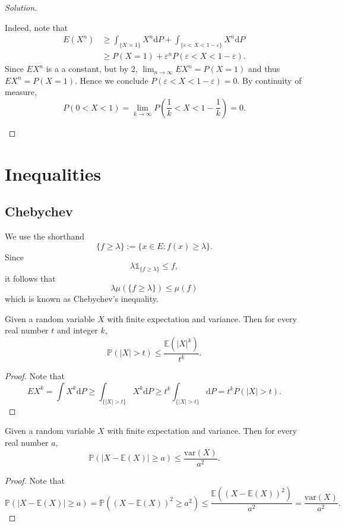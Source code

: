 \documentclass[11pt,singlecolumn, openany, citestyle=authoryear]{elegantbook}
\begin{document}
\begin{CJK}{UTF8}{gbsn}
\begin{proof}[Solution]
\begin{enumerate}
        Indeed, note that 
        \begin{align*}
            E(X^n)&\geqslant \int_{\{X=1\}}X^n \mathrm{d}P+\int_{\{\varepsilon<X<1-\varepsilon\}}
            X^n \mathrm{d}P \\
            &\geqslant P(X=1)+\varepsilon^nP(\varepsilon<X<1-\varepsilon). 
        \end{align*}
        Since $EX^n$ is a a constant, but by 2, $\lim_{n\to\infty} EX^n=P(X=1)$ and thus 
        $EX^n=P(X=1)$. Hence we conclude $P(\varepsilon < X < 1-\varepsilon)=0$.
        By continuity of measure, 
        $$
        P(0<X<1)=\lim_{k\to\infty}P(\frac{1}{k}<X<1-\frac{1}{k})=0.
        $$
    \end{enumerate}
\end{proof}

\section{Inequalities}
\subsection{Chebychev}
We use the shorthand
$$
\{f \geq \lambda\} := \{x \in E : f(x) \geq \lambda\}.
$$
Since 
$$
\lambda \mathds{1}_{\{f \geq \lambda\}} \leq f,
$$
it follows that 
$$
\lambda \mu(\{f \geq \lambda\})\leq \mu(f)
$$
which is known as Chebychev's inequality. 
\begin{example}
    Given a random variable $X$ with finite expectation and variance. Then for every real
    number $t$ and integer $k$,
    $$
    \mathbb{P}(|X| > t) \leqslant \frac{\mathbb{E}(|X|^k)}{t^k}.
    $$
\end{example}
\begin{proof}Note that
    $$
        EX^k=\int X^k\mathrm{d}P \geqslant \int_{\{|X|>t\}} X^k\mathrm{d}P
        \geqslant t^k \int_{\{|X|>t\}} \mathrm{d}P=t^k P(|X|>t).
    $$
\end{proof}

\begin{example}
    Given a random variable $X$ with finite expectation and variance. Then for every real
    number $a$,
    $$
    \mathbb{P}(|X-\mathbb{E}(X)|\geq a) \leq \frac{\text{var}(X)}{a^2}.
    $$
\end{example}
\begin{proof}
    Note that 
    $$
    \mathbb{P}(|X-\mathbb{E}(X)|\geq a) = \mathbb{P}((X-\mathbb{E}(X))^2\geq a^2)
    \leq \frac{\mathbb{E}((X-\mathbb{E}(X))^2)}{a^2} = \frac{\text{var}(X)}{a^2}.
    $$ 
\end{proof}


\end{CJK}
\end{document}
